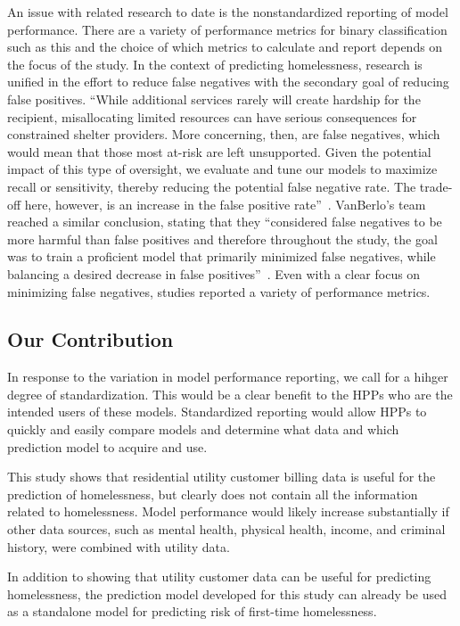 \documentclass[10pt,letterpaper]{article}
\newcommand{\red}[1]{{\color{red}{#1}}}
\begin{document}
An issue with related research to date is the nonstandardized reporting of model performance. There are a variety of performance metrics for binary classification such as this and the choice of which metrics to calculate and report depends on the focus of the study. In the context of predicting homelessness, research is unified in the effort to reduce false negatives with the secondary goal of reducing false positives. ``While  additional  services  rarely  will  create  hardship  for the  recipient,  misallocating  limited  resources  can  have  serious  consequences for constrained shelter providers. More concerning, then, are false negatives, which  would  mean  that  those  most  at-risk  are  left  unsupported.  Given  the potential  impact  of  this  type  of  oversight,  we  evaluate  and  tune  our  models to maximize recall or sensitivity, thereby reducing the potential false negative rate.  The  trade-off  here,  however,  is  an increase  in  the  false  positive  rate''~\cite{hong2018applications}. VanBerlo's team reached a similar conclusion, stating that they ``considered false negatives to be more harmful than false positives and therefore throughout the study, the goal was to train a proficient model that primarily minimized false negatives, while balancing a desired decrease in false positives''~\cite{vanberlo2021interpretable}. \red{Remove quotes?} Even with a clear focus on minimizing false negatives, studies reported a variety of performance metrics.

\subsection*{Our Contribution}
In response to the variation in model performance reporting, we call for a hihger degree of standardization. This would be a clear benefit to the HPPs who are the intended users of these models. Standardized reporting would allow HPPs to quickly and easily compare models and determine what data and which prediction model to acquire and use.

This study shows that residential utility customer billing data is useful for the prediction of homelessness, but clearly does not contain all the information related to homelessness. Model performance would likely increase substantially if other data sources, such as mental health, physical health, income, and criminal history, were combined with utility data.

In addition to showing that utility customer data can be useful for predicting homelessness, the prediction model developed for this study can already be used as a standalone model for predicting risk of first-time homelessness.
\end{document}

